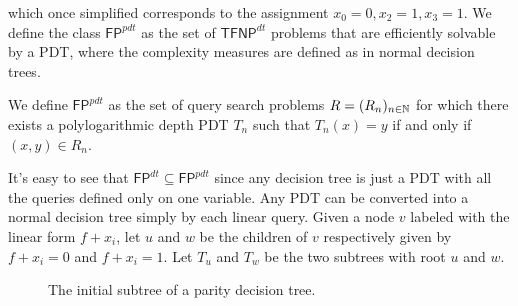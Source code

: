 which once simplified corresponds to the assignment $x_0 = 0, x_2 = 1, x_3 = 1$. We define the class $\mathsf{FP}^{pdt}$ as the set of $\mathsf{TFNP}^{dt}$ problems that are efficiently solvable by a PDT, where the complexity measures are defined as in normal decision trees.

\begin{definition}
 We define $\mathsf{FP}^{pdt}$ as the set of query search problems $R = (R_n)_{n \in \mathbb{N}}$ for which there exists a polylogarithmic depth PDT $T_n$ such that $T_n(x) = y$ if and only if $(x,y) \in R_n$.
\end{definition}

It's easy to see that $\mathsf{FP}^{dt} \subseteq \mathsf{FP}^{pdt}$ since any decision tree is just a PDT with all the queries defined only on one variable. Any PDT can be converted into a normal decision tree simply by  each linear query. Given a node $v$ labeled with the linear form $f + x_i$, let $u$ and $w$ be the children of $v$ respectively given by $f + x_i = 0$ and $f+x_i = 1$. Let $T_u$ and $T_w$ be the two subtrees with root $u$ and $w$.

\newpage

\begin{figure}[H]
    \centering


    \caption{The initial subtree of a parity decision tree.}
\end{figure}

